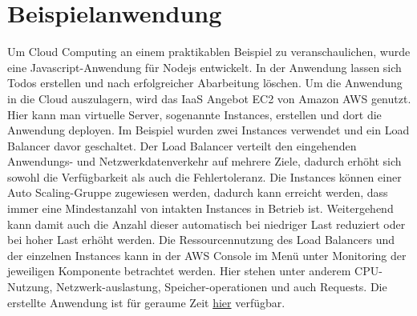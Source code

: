\section{Beispielanwendung}

Um Cloud Computing an einem praktikablen Beispiel zu veranschaulichen, wurde eine Javascript-Anwendung für Nodejs entwickelt. In der Anwendung lassen sich Todos erstellen und nach erfolgreicher Abarbeitung löschen. Um die Anwendung in die Cloud auszulagern, wird das IaaS Angebot EC2 von Amazon AWS genutzt. Hier kann man virtuelle Server, sogenannte \glqq Instances\grqq{}, erstellen und dort die Anwendung deployen. Im Beispiel wurden zwei \glqq Instances\grqq{} verwendet und ein Load Balancer davor geschaltet. Der Load Balancer verteilt den eingehenden Anwendungs- und Netzwerkdatenverkehr auf mehrere Ziele, dadurch erhöht sich sowohl die Verfügbarkeit als auch die Fehlertoleranz. Die \glqq Instances\grqq{} können einer Auto Scaling-Gruppe zugewiesen werden, dadurch kann erreicht werden, dass immer eine Mindestanzahl von intakten \glqq Instances\grqq{} in Betrieb ist. Weitergehend kann damit auch die Anzahl dieser automatisch bei niedriger Last reduziert oder bei hoher Last erhöht werden. Die Ressourcennutzung des Load Balancers und der einzelnen \glqq Instances\grqq{} kann in der \glqq AWS Console\grqq{} im Menü unter Monitoring der jeweiligen Komponente betrachtet werden. Hier stehen unter anderem CPU-Nutzung, Netzwerk-auslastung, Speicher-operationen und auch Requests. Die erstellte Anwendung ist für geraume Zeit  \href{http://test-lb-1608271566.us-east-1.elb.amazonaws.com:8080/}{hier} verfügbar\cite{aws}.